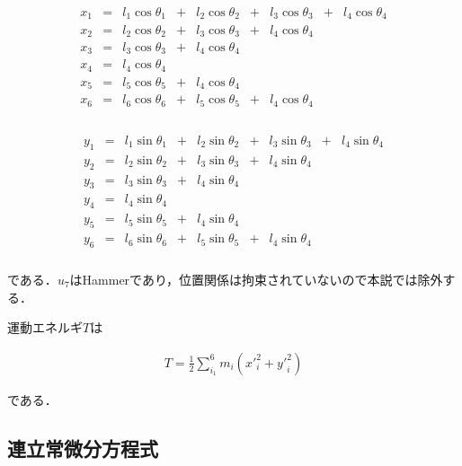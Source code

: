 \begin{eqnarray}
    \begin{matrix}
        x_1 &=& l_1 \cos \theta_1 &+& l_2 \cos \theta_2 &+& l_3 \cos \theta_3 &+& l_4 \cos \theta_4\\
        x_2 &=& l_2 \cos \theta_2 &+& l_3 \cos \theta_3 &+& l_4 \cos \theta_4 & & \\
        x_3 &=& l_3 \cos \theta_3 &+& l_4 \cos \theta_4 & & & &\\
        x_4 &=& l_4 \cos \theta_4 & & & & & &\\
        x_5 &=& l_5 \cos \theta_5 &+& l_4 \cos \theta_4 & & & &\\
        x_6 &=& l_6 \cos \theta_6 &+& l_5 \cos \theta_5 &+& l_4 \cos \theta_4 & &\\
    \end{matrix}
\end{eqnarray}

\begin{eqnarray}
    \begin{matrix}
        y_1 &=& l_1 \sin \theta_1 &+& l_2 \sin \theta_2 &+& l_3 \sin \theta_3 &+& l_4 \sin \theta_4\\
        y_2 &=& l_2 \sin \theta_2 &+& l_3 \sin \theta_3 &+& l_4 \sin \theta_4 & & \\
        y_3 &=& l_3 \sin \theta_3 &+& l_4 \sin \theta_4 & & & &\\
        y_4 &=& l_4 \sin \theta_4 & & & & & &\\
        y_5 &=& l_5 \sin \theta_5 &+& l_4 \sin \theta_4 & & & &\\
        y_6 &=& l_6 \sin \theta_6 &+& l_5 \sin \theta_5 &+& l_4 \sin \theta_4 & & \\
    \end{matrix}
\end{eqnarray}

である．$u_7$はHammerであり，位置関係は拘束されていないので本説では除外する．

運動エネルギ$T$は

\begin{eqnarray}
    T = \frac{1}{2} \sum^6_{i_1} m_i({x'}_i^2 + {y'}_i^2)
\end{eqnarray}

である．



\subsection{連立常微分方程式}

